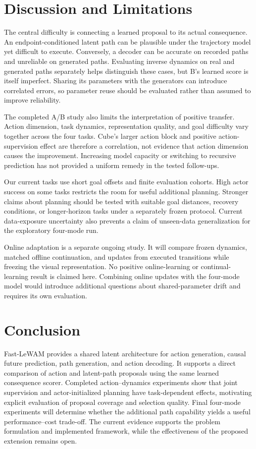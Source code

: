 \section{Discussion and Limitations}
\label{sec:limitations}

The central difficulty is connecting a learned proposal to its actual consequence. An endpoint-conditioned latent path can be plausible under the trajectory model yet difficult to execute. Conversely, a decoder can be accurate on recorded paths and unreliable on generated paths. Evaluating inverse dynamics on real and generated paths separately helps distinguish these cases, but B's learned score is itself imperfect. Sharing its parameters with the generators can introduce correlated errors, so parameter reuse should be evaluated rather than assumed to improve reliability.

The completed A/B study also limits the interpretation of positive transfer. Action dimension, task dynamics, representation quality, and goal difficulty vary together across the four tasks. Cube's larger action block and positive action-supervision effect are therefore a correlation, not evidence that action dimension causes the improvement. Increasing model capacity or switching to recursive prediction has not provided a uniform remedy in the tested follow-ups.

Our current tasks use short goal offsets and finite evaluation cohorts. High actor success on some tasks restricts the room for useful additional planning. Stronger claims about planning should be tested with suitable goal distances, recovery conditions, or longer-horizon tasks under a separately frozen protocol. Current data-exposure uncertainty also prevents a claim of unseen-data generalization for the exploratory four-mode run.

Online adaptation is a separate ongoing study. It will compare frozen dynamics, matched offline continuation, and updates from executed transitions while freezing the visual representation. No positive online-learning or continual-learning result is claimed here. Combining online updates with the four-mode model would introduce additional questions about shared-parameter drift and requires its own evaluation.

\section{Conclusion}

Fast-LeWAM provides a shared latent architecture for action generation, causal future prediction, path generation, and action decoding. It supports a direct comparison of action and latent-path proposals using the same learned consequence scorer. Completed action--dynamics experiments show that joint supervision and actor-initialized planning have task-dependent effects, motivating explicit evaluation of proposal coverage and selection quality. Final four-mode experiments will determine whether the additional path capability yields a useful performance--cost trade-off. The current evidence supports the problem formulation and implemented framework, while the effectiveness of the proposed extension remains open.
